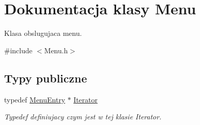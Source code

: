 \hypertarget{class_menu}{}\section{Dokumentacja klasy Menu}
\label{class_menu}


Klasa obslugujaca menu.  




{\ttfamily \#include $<$Menu.\+h$>$}

\subsection*{Typy publiczne}
\begin{DoxyCompactItemize}
\item 
\hypertarget{class_menu_aceaa934be18280340c221593bbee54d6}{}typedef \hyperlink{class_menu_entry}{Menu\+Entry} $\ast$ \hyperlink{class_menu_aceaa934be18280340c221593bbee54d6}{Iterator}\label{class_menu_aceaa934be18280340c221593bbee54d6}

\begin{DoxyCompactList}\small\item\em Typedef definiujacy czym jest w tej klasie Iterator. \end{DoxyCompactList}\end{DoxyCompactItemize}
